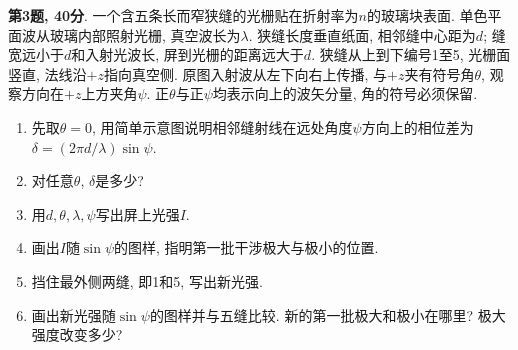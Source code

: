 \begin{exercise}
\textbf{第3题, 40分}. \label{exam:f3.3}
一个含五条长而窄狭缝的光栅贴在折射率为$n$的玻璃块表面. 单色平面波从玻璃内部照射光栅, 真空波长为$\lambda$. 狭缝长度垂直纸面, 相邻缝中心距为$d$; 缝宽远小于$d$和入射光波长, 屏到光栅的距离远大于$d$. 狭缝从上到下编号1至5, 光栅面竖直, 法线沿$+z$指向真空侧. 原图入射波从左下向右上传播, 与$+z$夹有符号角$\theta$, 观察方向在$+z$上方夹角$\psi$. 正$\theta$与正$\psi$均表示向上的波矢分量, 角的符号必须保留.
\begin{enumerate}[label=(\alph*)]
\item 先取$\theta=0$, 用简单示意图说明相邻缝射线在远处角度$\psi$方向上的相位差为$\delta=(2\pi d/\lambda)\sin\psi$.
\item 对任意$\theta$, $\delta$是多少?
\item 用$d,\theta,\lambda,\psi$写出屏上光强$I$.
\item 画出$I$随$\sin\psi$的图样, 指明第一批干涉极大与极小的位置.
\item 挡住最外侧两缝, 即1和5, 写出新光强.
\item 画出新光强随$\sin\psi$的图样并与五缝比较. 新的第一批极大和极小在哪里? 极大强度改变多少?
\end{enumerate}
\end{exercise}
